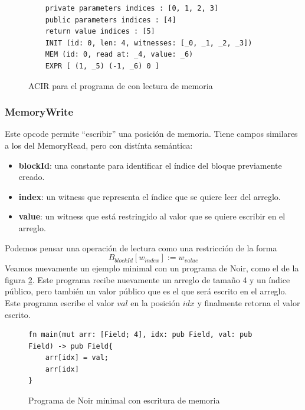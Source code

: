 \begin{figure} 
\centering
\begin{minipage}{\textwidth}
\begin{verbatim}
    private parameters indices : [0, 1, 2, 3]
    public parameters indices : [4]
    return value indices : [5]
    INIT (id: 0, len: 4, witnesses: [_0, _1, _2, _3]) 
    MEM (id: 0, read at: _4, value: _6) 
    EXPR [ (1, _5) (-1, _6) 0 ]
\end{verbatim}
\end{minipage}

\caption{ACIR para el programa de con lectura de memoria}
\label{fig:ACIR_ejemplo_mem_read}
\end{figure}

\subsubsection{\textbf{MemoryWrite}}
Este opcode permite “escribir'' una posición de memoria. Tiene campos similares a los del MemoryRead, pero con distínta semántica:
\begin{itemize}
    \item \textbf{blockId}: una constante para identificar el índice del bloque previamente creado.
    \item \textbf{index}: un witness que representa el índice que se quiere leer del arreglo.
    \item \textbf{value}: un witness que está restringido al valor que se quiere escribir en el arreglo. 
\end{itemize}
Podemos pensar una operación de lectura como una restricción de la forma
$$B_{blockId}[w_{index}] := w_{value}$$ 
Veamos nuevamente un ejemplo minimal con un programa de Noir, como el de la figura \ref{fig:noir_ejemplo_mem_write}. Este programa recibe nuevamente un arreglo de tamaño 4 y un índice público, pero también un valor público que es el que será escrito en el arreglo. Este programa escribe el valor $val$ en la posición $idx$ y finalmente retorna el valor escrito. 



\begin{figure} 
\centering
\begin{verbatim}
fn main(mut arr: [Field; 4], idx: pub Field, val: pub Field) -> pub Field{
    arr[idx] = val;
    arr[idx]
}
\end{verbatim}
\caption{Programa de Noir minimal con escritura de memoria}
\label{fig:noir_ejemplo_mem_write}
\end{figure}

